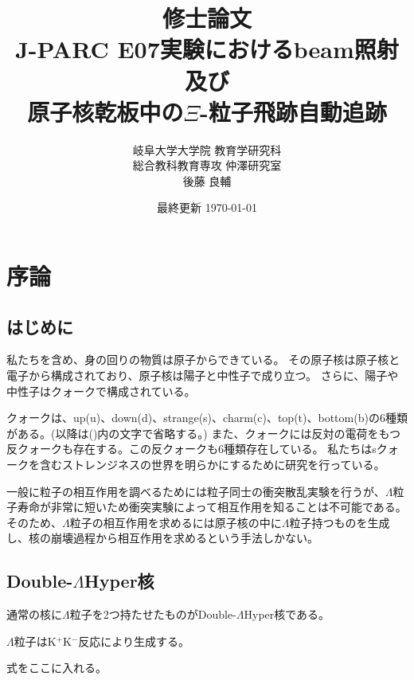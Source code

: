 \documentclass[12pt,a4paper]{jarticle}
\begin{document}
\begin{titlepage}
\title{\vspace{60mm} \LARGE 修士論文\vspace{10mm}\\J-PARC E07実験におけるbeam照射及び\\原子核乾板中の$\Xi$-粒子飛跡自動追跡}
\author{\Large 岐阜大学大学院 教育学研究科 \\ \vspace{5mm}
\Large 総合教科教育専攻 仲澤研究室 \\ \vspace{5mm}
\LARGE 後藤 良輔}
\date{最終更新 \today}
\maketitle
\thispagestyle{empty} %
\end{titlepage}

\thispagestyle{empty} %
\tableofcontents
\newpage
\section{序論}
\subsection{はじめに}
私たちを含め、身の回りの物質は原子からできている。
その原子核は原子核と電子から構成されており、原子核は陽子と中性子で成り立つ。
さらに、陽子や中性子はクォークで構成されている。
\par
クォークは、up(u)、down(d)、strange(s)、charm(c)、top(t)、bottom(b)の6種類がある。(以降は()内の文字で省略する。)
また、クォークには反対の電荷をもつ反クォークも存在する。この反クォークも6種類存在している。
私たちはsクォークを含むストレンジネスの世界を明らかにするために研究を行っている。
\par
一般に粒子の相互作用を調べるためには粒子同士の衝突散乱実験を行うが、$\Lambda$粒子寿命が非常に短いため衝突実験によって相互作用を知ることは不可能である。
そのため、$\Lambda$粒子の相互作用を求めるには原子核の中に$\Lambda$粒子持つものを生成し、核の崩壊過程から相互作用を求めるという手法しかない。
\subsection{Double-$\Lambda$Hyper核}
通常の核に$\Lambda$粒子を2つ持たせたものがDouble-$\Lambda$Hyper核である。
\par
$\Lambda$粒子はK$^+$K$^-$反応により生成する。
\par
式をここに入れる。
\end{document}
